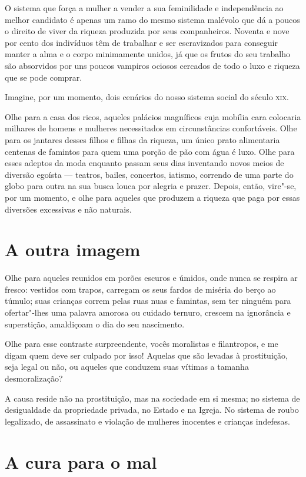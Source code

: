 O sistema que força a mulher a vender a sua feminilidade e independência
ao melhor candidato é apenas um ramo do mesmo sistema malévolo que dá a poucos
o direito de viver da riqueza produzida por seus companheiros. Noventa e
nove por cento dos indivíduos têm de trabalhar e ser escravizados para
conseguir manter a alma e o corpo minimamente unidos, já que os frutos
do seu trabalho são absorvidos por uns poucos vampiros ociosos cercados
de todo o luxo e riqueza que se pode comprar.

Imagine, por um momento, dois cenários do nosso sistema social do século \textsc{xix}.

Olhe para a casa dos ricos, aqueles palácios magníficos cuja mobília
cara colocaria milhares de homens e mulheres necessitados em
circunstâncias confortáveis. Olhe para os jantares desses filhos e
filhas da riqueza, um único prato alimentaria centenas de famintos para
quem uma porção de pão com água é luxo. Olhe para esses adeptos da moda
enquanto passam seus dias inventando novos meios de diversão egoísta --- teatros, bailes, concertos, iatismo, correndo de uma parte do globo para
outra na sua busca louca por alegria e prazer. Depois, então, vire"-se,
por um momento, e olhe para aqueles que produzem a riqueza que paga por
essas diversões excessivas e não naturais.

\section{A outra imagem}

Olhe para aqueles reunidos em porões escuros e úmidos, onde nunca se respira
ar fresco: vestidos com trapos, carregam os seus fardos de miséria do
berço ao túmulo; suas crianças correm pelas ruas nuas e famintas, sem ter ninguém para ofertar"-lhes uma palavra amorosa ou cuidado ternuro, crescem na ignorância e superstição, amaldiçoam o dia do seu nascimento.

Olhe para esse contraste surpreendente, vocês moralistas e filantropos,
e me digam quem deve ser culpado por isso! Aquelas que são levadas à
prostituição, seja legal ou não, ou aqueles que conduzem suas vítimas a
tamanha desmoralização?

A causa reside não na prostituição, mas na sociedade em si mesma; no
sistema de desigualdade da propriedade privada, no Estado e na Igreja. No
sistema de roubo legalizado, de assassinato e violação de mulheres
inocentes e crianças indefesas.

\section{A cura para o mal}

